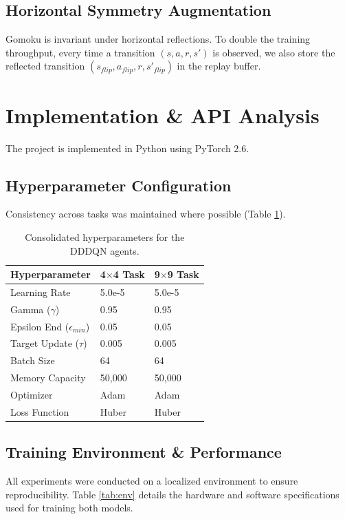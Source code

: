 \documentclass[9pt,a4paper,twocolumn,twoside]{rho-class/rho}
\begin{document}
    \subsection{Horizontal Symmetry Augmentation}
        Gomoku is invariant under horizontal reflections. To double the training throughput, every time a transition $(s, a, r, s')$ is observed, we also store the reflected transition $(s_{flip}, a_{flip}, r, s'_{flip})$ in the replay buffer.

\section{Implementation \& API Analysis}
    The project is implemented in Python using PyTorch 2.6.

    \subsection{Hyperparameter Configuration}
        Consistency across tasks was maintained where possible (Table \ref{tab:hypers}).

        \begin{table}[h]
            \centering
            \begin{tabular}{lll}
                \toprule
                Hyperparameter & 4$\times$4 Task & 9$\times$9 Task \\
                \midrule
                Learning Rate & 5.0e-5 & 5.0e-5 \\
                Gamma ($\gamma$) & 0.95 & 0.95 \\
                Epsilon End ($\epsilon_{min}$) & 0.05 & 0.05 \\
                Target Update ($\tau$) & 0.005 & 0.005 \\
                Batch Size & 64 & 64 \\
                Memory Capacity & 50,000 & 50,000 \\
                Optimizer & Adam & Adam \\
                Loss Function & Huber & Huber \\
                \bottomrule
            \end{tabular}
            \caption{Consolidated hyperparameters for the DDDQN agents.}
            \label{tab:hypers}
        \end{table}

    \subsection{Training Environment \& Performance}
        All experiments were conducted on a localized environment to ensure reproducibility. Table \ref{tab:env} details the hardware and software specifications used for training both models.
\end{document}
